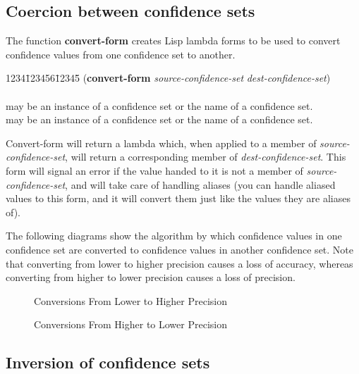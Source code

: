 \subsection{Coercion between confidence sets}

The function {\bf convert-form} creates Lisp lambda forms to be used
to convert confidence values from one confidence set to another.

\begin{tabbing}
1234\=123456\=12345\= \kill
({\bf convert-form} {\it source-confidence-set\/} {\it
dest-confidence-set\/}) \\
\\
 may be an instance of a confidence set or the name of a confidence set.\\
 may be an instance of a confidence set or
the name of a confidence set. \\
\end{tabbing}
Convert-form will return a lambda which, when applied to a member of
{\it source-confidence-set\/}, will return a corresponding member of
{\it dest-confidence-set\/}. This form will signal an error if the
value handed to it is not a member of {\it source-confidence-set\/},
and will take care of handling aliases (you can handle aliased values
to this form, and it will convert them just like the values they are
aliases of).


The following diagrams show the algorithm by which confidence values
in one confidence set are converted to confidence values in
another confidence set.  Note that converting from lower to higher
precision causes a loss of accuracy, whereas converting from higher
to lower precision causes a loss of precision.

\begin{figure}
\vspace{7.5cm}
\caption{Conversions From Lower to Higher Precision}
\end{figure}
\begin{figure}
\vspace{6.0cm}
\caption{Conversions From Higher to Lower Precision}
\end{figure}



\subsection{Inversion of confidence sets}


